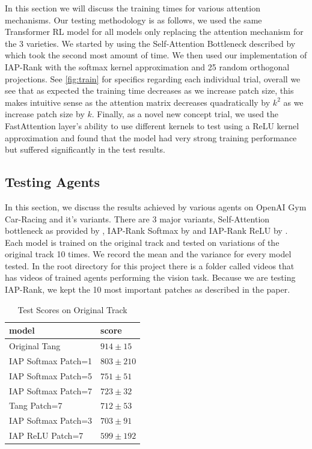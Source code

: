 \documentclass[10pt,twocolumn,letterpaper]{article}
\begin{document}
In this section we will discuss the training times for various attention mechanisms.
Our testing methodology is as follows, we used the same Transformer RL model for all
models only replacing the attention mechanism for the 3 varieties. We started by 
using the Self-Attention Bottleneck described by \cite{Tang} which took the second 
most amount of time. We then used our implementation of IAP-Rank with the softmax kernel
approximation and 25 random orthogonal projections. 
See \ref{fig:train} for specifics regarding each individual trial, overall we see that 
as expected the training time decreases as we increase patch size, this makes intuitive 
sense as the attention matrix decreases quadratically by $k^2$ as we increase patch size
by $k$. Finally, as a novel new concept trial, we used the FastAttention layer's 
ability to use different kernels to test using a ReLU kernel approximation and found
that the model had very strong training performance but suffered significantly in the 
test results.

\subsection{Testing Agents}

In this section, we discuss the results achieved by various agents on OpenAI Gym Car-Racing
and it's variants. There are 3 major variants, Self-Attention bottleneck as provided by
\cite{Tang}, IAP-Rank Softmax by \cite{choromanski} and IAP-Rank ReLU by \cite{choromanski}.
Each model is trained on the original track and tested on variations of the original track
10 times. We record the mean and the variance for every model tested. In the root 
directory for this project there is a folder called videos that has videos of trained 
agents performing the vision task. Because we are testing IAP-Rank, we kept the 10 
most important patches as described in the paper.

\begin{table}[h]
\centering
\caption{\label{tab:original}Test Scores on Original Track}
\begin{tabular}{|l|l|}
\hline
model               & score \\ \hline
Original Tang       & $914 \pm 15$  \\ \hline
IAP Softmax Patch=1 & $803 \pm 210$  \\ \hline
IAP Softmax Patch=5 & $751 \pm 51$  \\ \hline
IAP Softmax Patch=7 & $723 \pm 32$   \\ \hline
Tang Patch=7        & $712 \pm 53$   \\ \hline
IAP Softmax Patch=3 & $703 \pm 91$  \\ \hline
IAP ReLU Patch=7    & $599 \pm 192$  \\ \hline
\end{tabular}
\end{table}
\end{document}

